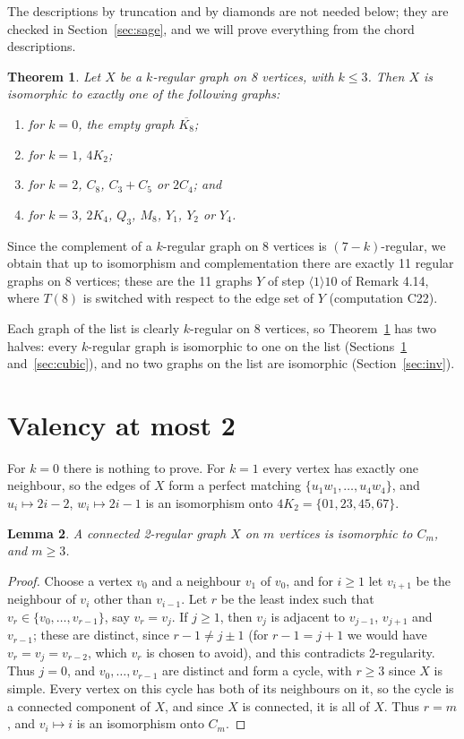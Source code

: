 \documentclass[11pt]{amsart}
\newtheorem{theorem}{Theorem}[section]
\newtheorem{lemma}[theorem]{Lemma}
\theoremstyle{definition}
\begin{document}
The descriptions by truncation and by diamonds are not needed below; they are checked in
Section~\ref{sec:sage}, and we will prove everything from the chord descriptions.

\begin{theorem}\label{thm:main}
Let $X$ be a $k$-regular graph on 8 vertices, with $k\le3$. Then $X$ is isomorphic to exactly one
of the following graphs:
\begin{enumerate}
\item for $k=0$, the empty graph $\overline{K_8}$;
\item for $k=1$, $4K_2$;
\item for $k=2$, $C_8$, $C_3+C_5$ or $2C_4$; and
\item for $k=3$, $2K_4$, $Q_3$, $M_8$, $Y_1$, $Y_2$ or $Y_4$.
\end{enumerate}
\end{theorem}

Since the complement of a $k$-regular graph on 8 vertices is $(7-k)$-regular, we obtain that up to
isomorphism and complementation there are exactly 11 regular graphs on 8 vertices; these are the
11 graphs $Y$ of step $\langle1\rangle10$ of Remark 4.14, where $T(8)$ is switched with respect to
the edge set of $Y$ (computation C22).

Each graph of the list is clearly $k$-regular on 8 vertices, so Theorem~\ref{thm:main} has two
halves: every $k$-regular graph is isomorphic to one on the list (Sections~\ref{sec:small}
and~\ref{sec:cubic}), and no two graphs on the list are isomorphic (Section~\ref{sec:inv}).

\section{Valency at most 2}\label{sec:small}

For $k=0$ there is nothing to prove. For $k=1$ every vertex has exactly one neighbour, so the edges
of $X$ form a perfect matching $\{u_1w_1,\dots,u_4w_4\}$, and $u_i\mapsto 2i-2$, $w_i\mapsto
2i-1$ is an isomorphism onto $4K_2=\{01,23,45,67\}$.

\begin{lemma}\label{lem:cycle}
A connected 2-regular graph $X$ on $m$ vertices is isomorphic to $C_m$, and $m\ge3$.
\end{lemma}

\begin{proof}
Choose a vertex $v_0$ and a neighbour $v_1$ of $v_0$, and for $i\ge1$ let $v_{i+1}$ be the
neighbour of $v_i$ other than $v_{i-1}$. Let $r$ be the least index such that
$v_r\in\{v_0,\dots,v_{r-1}\}$, say $v_r=v_j$. If $j\ge1$, then $v_j$ is adjacent to $v_{j-1}$,
$v_{j+1}$ and $v_{r-1}$; these are distinct, since $r-1\ne j\pm1$ (for $r-1=j+1$ we would have
$v_r=v_{j}=v_{r-2}$, which $v_r$ is chosen to avoid), and this contradicts 2-regularity. Thus
$j=0$, and $v_0,\dots,v_{r-1}$ are distinct and form a cycle, with $r\ge3$ since $X$ is simple.
Every vertex on this cycle has both of its neighbours on it, so the cycle is a connected component
of $X$, and since $X$ is connected, it is all of $X$. Thus $r=m$, and $v_i\mapsto i$ is an
isomorphism onto $C_m$.
\end{proof}
\end{document}
